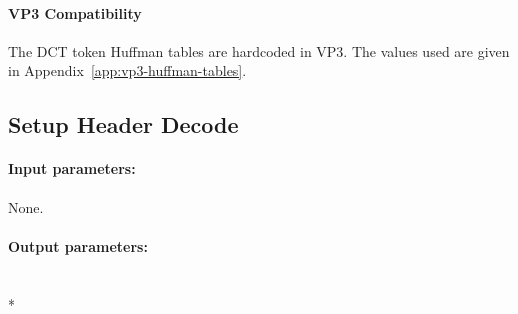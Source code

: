 \documentclass[9pt,letterpaper]{book}
\numberwithin{equation}{chapter}
\numberwithin{figure}{chapter}
\numberwithin{table}{chapter}
\begin{document}
\paragraph{VP3 Compatibility}

The DCT token Huffman tables are hardcoded in VP3.
The values used are given in Appendix~\ref{app:vp3-huffman-tables}.

\subsection{Setup Header Decode}

\paragraph{Input parameters:} None.

\paragraph{Output parameters:}\hfill\\*
\end{document}
